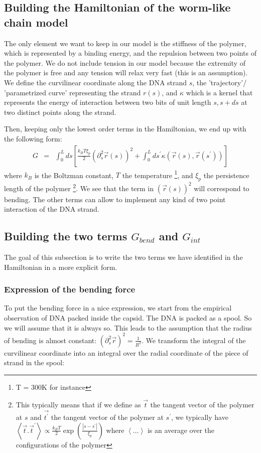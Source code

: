 \documentclass{article}
\begin{document}
\subsection{Building the Hamiltonian of the worm-like chain model}
The only element we want to keep in our model is the stiffness of the polymer, which is represented by a binding energy, and the repulsion between two points of the polymer. We do not include tension in our model because the extremity of the polymer is free and any tension will relax very fast (this is an assumption). We define the curvilinear coordinate along the DNA strand $s$, the 'trajectory'/ 'parametrized curve' representing the strand $r(s)$, and $\kappa$ which is a kernel that represents the energy of interaction between two bits of unit length $s, s+ds$ at two distinct points along the strand.

Then, keeping only the lowest order terms in the Hamiltonian, we end up with the following form:
\begin{eqnarray*}
    G &=& \int_{0}^{L} ds \left[ \frac{k_B T \xi_p}{2} \left( \partial_s^2 \vec{r}(s) \right)^2 + \int_0^L ds^\prime \kappa \left(\vec{r}(s), \vec{r}(s^\prime) \right) \right]
\end{eqnarray*}
 where $k_B$ is the Boltzman constant, $T$ the temperature \footnote{T = 300K for instance}, and $\xi_p$ the persistence length of the polymer \footnote{This typically means that if we define as $\vec{t}$ the tangent vector of the polymer at $s$ and $\vec{t^\prime}$ the tangent vector of the polymer at $ s^\prime $, we typically have $\left\langle \vec{t} . \vec{t}^\prime \right\rangle \propto \frac{k_B T}{2} \exp{ \left( \frac{\left\vert s-s^\prime\right\vert }{\xi_p} \right )}$ where $\left\langle \dots \right\rangle $ is an average over the configurations of the polymer}.
We see that the term in $ \left( \vec{r}(s) \right)^2 $ will correspond to bending. The other terms can allow to implement any kind of two point interaction of the DNA strand.

\subsection{Building the two terms $G_{bend}$ and $G_{int}$}
The goal of this subsection is to write the two terms we have identified in the Hamiltonian in a more explicit form.

\subsubsection{Expression of the bending force}
To put the bending force in a nice expression, we start from the empirical observation of DNA packed inside the capsid. The DNA is packed as a spool. So we will assume that it is always so. This leads to the assumption that the radius of bending is almost constant: $\left( \partial_s^2 \vec{r} \right)^2=\frac{1}{R^2}$. We transform the integral of the curvilinear coordinate into an integral over the radial coordinate of the piece of strand in the spool:
\end{document}
